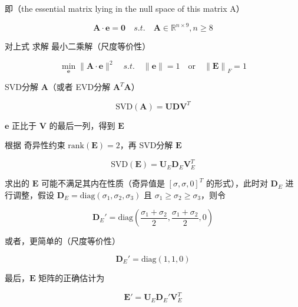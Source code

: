 \documentclass[12pt,a4paper]{article}
\begin{document}
即（the essential matrix lying in the null space of this matrix A）

$$
\mathbf{A} \cdot \mathbf{e} = \mathbf{0}
\quad s.t. \quad
\mathbf{A} \in \mathbb{R}^{n \times 9}, n \geq 8
$$

对上式 求解 最小二乘解（尺度等价性）

$$
\min_{\mathbf{e}} \|\mathbf{A} \cdot \mathbf{e}\|^2
\quad s.t. \quad
\|\mathbf{e}\| = 1
\quad \text{or} \quad
{\|\mathbf{E}\|}_F = 1
$$

SVD分解 $\mathbf{A}$（或者 EVD分解 $\mathbf{A}^T \mathbf{A}$）

$$
\text{SVD}(\mathbf{A}) = \mathbf{U} \mathbf{D} \mathbf{V}^T
$$

$\mathbf{e}$ 正比于 $\mathbf{V}$ 的最后一列，得到 $\mathbf{E}$  

根据 奇异性约束 $\text{rank}(\mathbf{E})=2$，再 SVD分解 $\mathbf{E}$  

$$
\text{SVD}(\mathbf{E}) =
\mathbf{U}_E \mathbf{D}_E \mathbf{V}_E^T
$$

求出的 $\mathbf{E}$ 可能不满足其内在性质（奇异值是 $[\sigma, \sigma, 0]^T$ 的形式），此时对 $\mathbf{D}_E$ 进行调整，假设 $\mathbf{D}_E = \text{diag}(\sigma_1, \sigma_2, \sigma_3)$ 且 $\sigma_1 \geq \sigma_2 \geq \sigma_3$，则令  

$$
\mathbf{D}_E' =
\text{diag}(\frac{\sigma_1+\sigma_2}{2}, \frac{\sigma_1+\sigma_2}{2}, 0)
$$

或者，更简单的（尺度等价性）

$$
\mathbf{D}_E' = \text{diag}(1, 1, 0)
$$

最后，$\mathbf{E}$ 矩阵的正确估计为

$$
\mathbf{E}' =
\mathbf{U}_E \mathbf{D}_E' \mathbf{V}_E^T
$$




\end{document}
